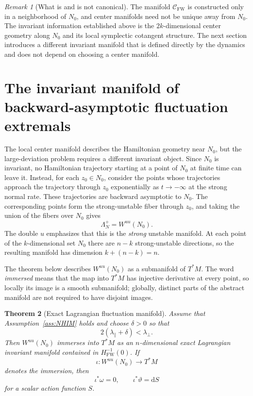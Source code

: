 \documentclass[11pt]{article}
\newtheorem{theorem}{Theorem}[section]
\theoremstyle{definition}
\theoremstyle{remark}
\newtheorem{remark}[theorem]{Remark}
\newcommand{\C}{\mathcal{C}}
\newcommand{\Lagr}{\Lambda}
\newcommand{\Hs}{H_{\mathrm{FW}}}
\newcommand{\dd}{\mathrm{d}}
\begin{document}
\begin{remark}[What is and is not canonical]
The manifold $\C_{\mathrm{FW}}$ is constructed only in a neighborhood of $N_0$, and center manifolds need not be unique away from $N_0$.  The invariant information established above is the $2k$-dimensional center geometry along $N_0$ and its local symplectic cotangent structure.  The next section introduces a different invariant manifold that is defined directly by the dynamics and does not depend on choosing a center manifold.
\end{remark}


\section{The invariant manifold of backward-asymptotic fluctuation extremals}
\label{sec:lagrangian}

The local center manifold describes the Hamiltonian geometry near $N_0$, but the large-deviation problem requires a different invariant object.  Since $N_0$ is invariant, no Hamiltonian trajectory starting at a point of $N_0$ at finite time can leave it.  Instead, for each $z_0\in N_0$, consider the points whose trajectories approach the trajectory through $z_0$ exponentially as $t\to-\infty$ at the strong normal rate.  These trajectories are backward asymptotic to $N_0$.  The corresponding points form the strong-unstable fiber through $z_0$, and taking the union of the fibers over $N_0$ gives
\begin{equation}
\Lagr_N^+=W^{uu}(N_0).
\label{eq:Lambda-def}
\end{equation}
The double $u$ emphasizes that this is the \emph{strong} unstable manifold.  At each point of the $k$-dimensional set $N_0$ there are $n-k$ strong-unstable directions, so the resulting manifold has dimension $k+(n-k)=n$.

The theorem below describes $W^{uu}(N_0)$ as a submanifold of $T^*M$.  The word \emph{immersed} means that the map into $T^*M$ has injective derivative at every point, so locally its image is a smooth submanifold; globally, distinct parts of the abstract manifold are not required to have disjoint images.

\begin{theorem}[Exact Lagrangian fluctuation manifold]
\label{thm:lagrangian}
Assume that Assumption~\ref{ass:NHIM} holds and choose $\delta>0$ so that
\begin{equation}
2(\lambda_{\parallel}+\delta)<\lambda_{\perp}.
\label{eq:two-bunching}
\end{equation}
Then $W^{uu}(N_0)$ immerses into $T^*M$ as an $n$-dimensional exact Lagrangian invariant manifold contained in $\Hs^{-1}(0)$.  If
\[
\iota:W^{uu}(N_0)\longrightarrow T^*M
\]
denotes the immersion, then
\begin{equation}
\iota^*\omega=0,
\qquad
\iota^*\vartheta=\dd S
\label{eq:exact-lag}
\end{equation}
for a scalar action function $S$.
\end{theorem}
\end{document}
